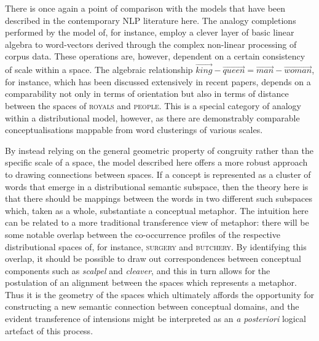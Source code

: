 There is once again a point of comparison with the models that have been described in the contemporary NLP literature here.  The analogy completions performed by the model of, for instance, \cite{MikolovEA2013b} employ a clever layer of basic linear algebra to word-vectors derived through the complex non-linear processing of corpus data.  These operations are, however, dependent on a certain consistency of scale within a space.  The algebraic relationship $\overrightarrow{king}-\overrightarrow{queen} = \overrightarrow{man}-\overrightarrow{woman}$, for instance, which has been discussed extensively in recent papers, depends on a comparability not only in terms of orientation but also in terms of distance between the spaces of \textsc{royals} and \textsc{people}.  This is a special category of analogy within a distributional model, however, as there are demonstrably comparable conceptualisations mappable from word clusterings of various scales.

By instead relying on the general geometric property of congruity rather than the specific scale of a space, the model described here offers a more robust approach to drawing connections between spaces.  If a concept is represented as a cluster of words that emerge in a distributional semantic subspace, then the theory here is that there should be mappings between the words in two different such subspaces which, taken as a whole, substantiate a conceptual metaphor.  The intuition here can be related to a more traditional transference view of metaphor: there will be some notable overlap between the co-occurrence profiles of the respective distributional spaces of, for instance, \textsc{surgery} and \textsc{butchery}.  By identifying this overlap, it should be possible to draw out correspondences between conceptual components such as \emph{scalpel} and \emph{cleaver}, and this in turn allows for the postulation of an alignment between the spaces which represents a metaphor.  Thus it is the geometry of the spaces which ultimately affords the opportunity for constructing a new semantic connection between conceptual domains, and the evident transference of intensions might be interpreted as an \emph{a posteriori} logical artefact of this process.

